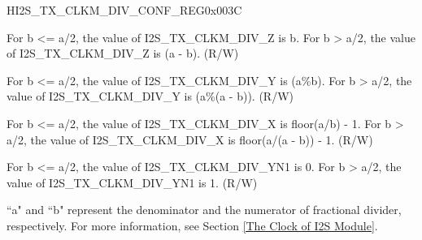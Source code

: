 \begin{register}{H}{I2S\_TX\_CLKM\_DIV\_CONF\_REG}{0x{}003C}\label{regdesc:I2STXCLKMDIVCONFREG}
%
%
%
%
%
\regnewline%
\begin{regdesc}\begin{reglist}
\label{fielddesc:I2STXCLKMDIVZ}\item [I2S\_TX\_CLKM\_DIV\_Z] For b <= a/2, the value of I2S\_TX\_CLKM\_DIV\_Z is b. For b > a/2, the value of I2S\_TX\_CLKM\_DIV\_Z is (a - b). (R/W)
\label{fielddesc:I2STXCLKMDIVY}\item [I2S\_TX\_CLKM\_DIV\_Y] For b <= a/2, the value of I2S\_TX\_CLKM\_DIV\_Y is (a\%b). For b > a/2, the value of I2S\_TX\_CLKM\_DIV\_Y is (a\%(a - b)). (R/W)
\label{fielddesc:I2STXCLKMDIVX}\item [I2S\_TX\_CLKM\_DIV\_X] For b <= a/2, the value of I2S\_TX\_CLKM\_DIV\_X is floor(a/b) - 1. For b > a/2, the value of I2S\_TX\_CLKM\_DIV\_X is floor(a/(a - b)) - 1. (R/W)
\label{fielddesc:I2STXCLKMDIVYN1}\item [I2S\_TX\_CLKM\_DIV\_YN1] For b <= a/2, the value of I2S\_TX\_CLKM\_DIV\_YN1 is 0. For b > a/2, the value of I2S\_TX\_CLKM\_DIV\_YN1 is 1. (R/W)
\end{reglist}\end{regdesc}
\vspace{-2em}
\begin{tiplisting}
``a" and ``b" represent the denominator and the numerator of fractional divider, respectively. For more information, see Section \ref{The Clock of I2S Module}.
\end{tiplisting}
\end{register}


